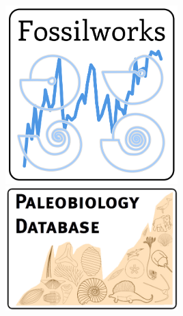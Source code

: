 \documentclass{beamer}
\begin{document}
\begin{frame}
\begin{columns}
\begin{column}{0.5\textwidth}
      \includegraphics[height = 0.3\textheight, width = 0.5\textwidth, keepaspectratio = true]{figure/fossilworks}
      \includegraphics[width = 0.5\textwidth, keepaspectratio = true]{figure/paleodb}

    \end{column}
  \end{columns}
\end{frame}
\end{document}
